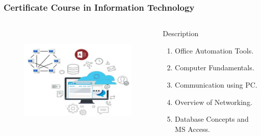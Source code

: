 \begin{frame}
	\frametitle{Certificate Course in Information Technology}
		\begin{columns}
		
		
		\begin{figure}
			\includegraphics[width=200pt,height=150pt]{figures/course_it.jpg}
		\end{figure}
		
		
		\begin{block}{Description}
			
			\begin{enumerate}
				\item Office Automation Tools. 
				\item Computer Fundamentals.
				\item Communication using PC.
				\item Overview of Networking.
				\item Database Concepts and MS Access.
			\end{enumerate}
			
		\end{block}
		
	\end{columns}
\end{frame}